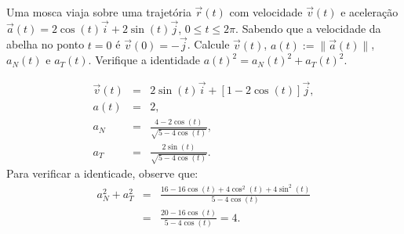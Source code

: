 \begin{exer} Uma mosca viaja sobre uma trajetória $\vec{r}(t)$ com velocidade $\vec{v}(t)$ e aceleração $\vec{a}(t)=2\cos(t)\vec{i}+2\sin(t)\vec{j}$, $0\leq t\leq 2\pi$. Sabendo que a velocidade da abelha no ponto $t=0$ é $\vec{v}(0)=-\vec{j}$. Calcule $\vec{v}(t)$, $a(t):=\|\vec{a}(t)\|$, $a_N(t)$ e $a_T(t)$. Verifique a identidade $a(t)^2=a_N(t)^2+a_T(t)^2$.

\end{exer}
\begin{resp}
  \begin{eqnarray*}
    \vec{v}(t) &=& 2\sin(t)\vec{i} + \left[1-2\cos(t)\right]\vec{j},\\
  a(t) &=& 2,\\
  a_N&=&\frac{4-2\cos(t)}{\sqrt{5-4\cos(t)}},\\
  a_T&=&\frac{2\sin(t)}{\sqrt{5-4\cos(t)}}.
  \end{eqnarray*}
  Para verificar a identicade, observe que:
  \begin{eqnarray*}
  a_N^2+a_T^2&=&\frac{16-16\cos(t)+4\cos^2(t)+4\sin^2(t)}{{5-4\cos(t)}}\\
  &=&\frac{20-16\cos(t)}{{5-4\cos(t)}}=4.
  \end{eqnarray*}
\end{resp}
